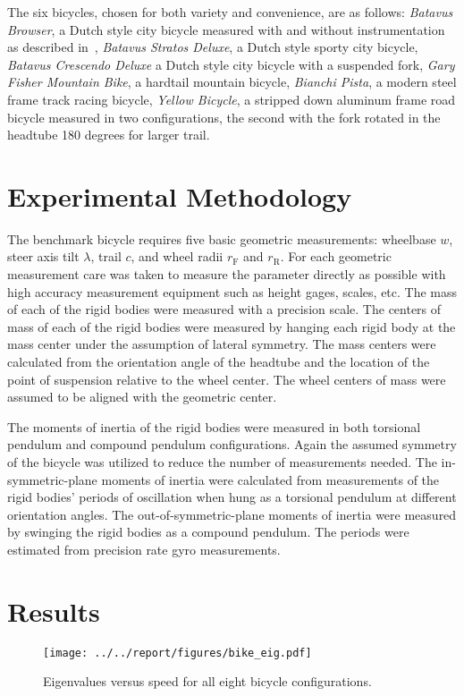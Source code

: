 \documentclass{bmd2010a}
\begin{document}
The six bicycles, chosen for both variety and convenience, are as follows:
\emph{Batavus Browser}, a Dutch style city bicycle measured with and without
instrumentation as described in~\cite{Kooijman2009a}, \emph{Batavus Stratos
Deluxe}, a Dutch style sporty city bicycle, \emph{Batavus Crescendo Deluxe} a
Dutch style city bicycle with a suspended fork, \emph{Gary Fisher Mountain
Bike}, a hardtail mountain bicycle, \emph{Bianchi Pista}, a modern steel frame
track racing bicycle, \emph{Yellow Bicycle}, a stripped down aluminum frame
road bicycle measured in two configurations, the second with the fork rotated
in the headtube 180 degrees for larger trail.

\section*{Experimental Methodology}
The benchmark bicycle requires five basic geometric measurements: wheelbase
$w$, steer axis tilt $\lambda$, trail $c$, and wheel radii $r_\mathrm{F}$
and $r_\mathrm{R}$. For each geometric measurement care was taken to measure
the parameter directly as possible with high accuracy measurement equipment
such as height gages, scales, etc. The mass of each of the rigid bodies were
measured with a precision scale. The centers of mass of each of the rigid
bodies were measured by hanging each rigid body at the mass center under the
assumption of lateral symmetry. The mass centers were calculated from the
orientation angle of the headtube and the location of the point of suspension
relative to the wheel center. The wheel centers of mass were assumed to be
aligned with the geometric center.

The moments of inertia of the rigid bodies were measured in both torsional
pendulum and compound pendulum configurations. Again the assumed symmetry of the
bicycle was utilized to reduce the number of measurements needed. The
in-symmetric-plane moments of inertia were calculated from measurements of the
rigid bodies' periods of oscillation when hung as a torsional pendulum at
different orientation angles. The out-of-symmetric-plane moments of inertia were
measured by swinging the rigid bodies as a compound pendulum. The periods were
estimated from precision rate gyro measurements.
\section*{Results}
\begin{figure}[htbp]
    \begin{center}
        \texttt{[image: ../../report/figures/bike\_eig.pdf]}
    \end{center}
    \caption{Eigenvalues versus speed for all eight bicycle configurations.}
    \label{fig:bike_eig}
\end{figure}
\end{document}
